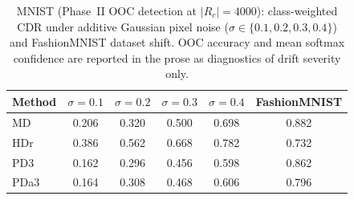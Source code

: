 \begin{table}[htbp]
\centering
\caption{MNIST (Phase~II OOC detection at $|R_c|=4000$):
class-weighted CDR under additive Gaussian pixel noise
($\sigma \in \{0.1, 0.2, 0.3, 0.4\}$) and FashionMNIST
dataset shift. OOC accuracy and mean softmax confidence
are reported in the prose as diagnostics of drift severity only.}
\label{tab:mnist-cdr}
\small
{}
\begin{tabular}{l S[table-format=1.3] S[table-format=1.3] S[table-format=1.3] S[table-format=1.3] S[table-format=1.3]}
\toprule
Method & {$\sigma=0.1$} & {$\sigma=0.2$} & {$\sigma=0.3$} & {$\sigma=0.4$} & {FashionMNIST} \\
\midrule
  MD & 0.206 & 0.320 & 0.500 & 0.698 & 0.882 \\
  HDr & 0.386 & 0.562 & 0.668 & 0.782 & 0.732 \\
  PD3 & 0.162 & 0.296 & 0.456 & 0.598 & 0.862 \\
  PDa3 & 0.164 & 0.308 & 0.468 & 0.606 & 0.796 \\
\bottomrule
\end{tabular}
\end{table}

